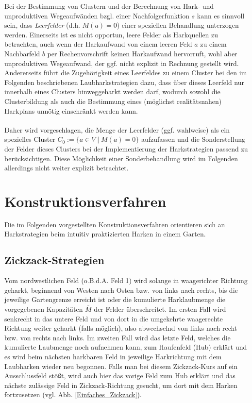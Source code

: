 \documentclass[fontsize=12pt,doubleside,openany,listof=totoc,listof=flat,listof=nochaptergap,numbers=noenddot]{scrbook}
\theoremstyle{style}
\begin{document}
Bei der Bestimmung von Clustern und der Berechnung von Hark- und unproduktiven Wegeaufwänden bzgl. einer Nachfolgerfunktion $s$ kann es sinnvoll sein, dass \textit{Leerfelder} (d.h. $M(a) = 0$) einer speziellen Behandlung unterzogen werden. Einerseits ist es nicht opportun, leere Felder als Harkquellen zu betrachten, auch wenn der Harkaufwand von einem leeren Feld $a$ zu einem Nachbarfeld $b$ per Rechenvorschrift keinen Harkaufwand hervorruft, wohl aber unproduktiven Wegeaufwand, der ggf. nicht explizit in Rechnung gestellt wird. Andererseits führt die Zugehörigkeit eines Leerfeldes zu einem Cluster bei den im Folgenden beschriebenen Laubharkstrategien dazu, dass über dieses Leerfeld nur innerhalb eines Clusters hinweggeharkt werden darf, wodurch sowohl die Clusterbildung als auch die Bestimmung eines (möglichst realitätsnahen) Harkplans unnötig einschränkt werden kann. \\
\\
Daher wird vorgeschlagen, die Menge der Leerfelder (ggf. wahlweise) als ein spezielles Cluster $C_0 := \{a \in V \mid M(a) = 0\}$ aufzufassen und die Sonderstellung der Felder dieses Clusters bei der Implementierung der Harkstrategien passend zu berücksichtigen. Diese Möglichkeit einer Sonderbehandlung wird im Folgenden allerdings nicht weiter explizit betrachtet.



\section{Konstruktionsverfahren}
\label{section_Intuitive_Strategien}

Die im Folgenden vorgestellten Konstruktionsverfahren orientieren sich an Harkstrategien beim intuitiv praktizierten Harken in einem Garten. 

\subsection{Zickzack-Strategien}
\label{section_Zickzack}

Vom nordwestlichen Feld (o.B.d.A. Feld 1) wird solange in waagerichter Richtung geharkt, beginnend von Westen nach Osten bzw. von links nach rechts, bis die jeweilige Gartengrenze erreicht ist oder die kumulierte Harklaubmenge die vorgegebenen Kapazitäten $\overline{M}$ der Felder überschreitet. Im ersten Fall wird senkrecht in das untere Feld und von dort in die umgekehrte waagerechte Richtung weiter geharkt (falls möglich), also abwechselnd von links nach recht bzw. von rechts nach links. Im zweiten Fall wird das letzte Feld, welches die kumulierte Laubmenge noch aufnehmen kann, zum Haufenfeld (Hub) erklärt und es wird beim nächsten harkbaren Feld in jeweilige Harkrichtung mit dem Laubharken wieder neu begonnen. Falls man bei diesem Zickzack-Kurs auf ein Ausschlussfeld stößt, wird auch hier das vorige Feld zum Hub erklärt und das nächste zulässige Feld in Zickzack-Richtung gesucht, um dort mit dem Harken fortzusetzen (vgl. Abb. \ref{Einfaches_Zickzack}). 
\end{document}
